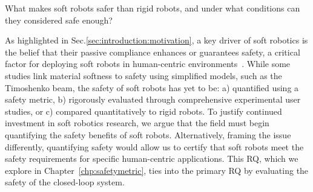\begin{researchquestion}\label{rq:soft_robotic_safety}
    What makes soft robots safer than rigid robots, and under what conditions can they considered safe enough?
\end{researchquestion}
As highlighted in Sec.\ref{sec:introduction:motivation}, a key driver of soft robotics is the belief that their passive compliance enhances or guarantees safety, a critical factor for deploying soft robots in human-centric environments~\citep{rus2015design, mengaldo2022concise}. While some studies link material softness to safety using simplified models, such as the Timoshenko beam\citep{abidi2017intrinsic}, the safety of soft robots has yet to be: a) quantified using a safety metric, b) rigorously evaluated through comprehensive experimental user studies, or c) compared quantitatively to rigid robots.
To justify continued investment in soft robotics research, we argue that the field must begin quantifying the safety benefits of soft robots. Alternatively, framing the issue differently, quantifying safety would allow us to certify that soft robots meet the safety requirements for specific human-centric applications.
This \gls{RQ}, which we explore in Chapter~\ref{chp:safetymetric}, ties into the primary \gls{RQ} by evaluating the safety of the closed-loop system.

